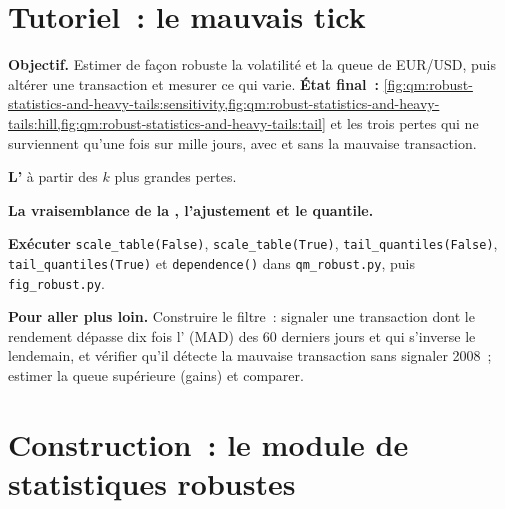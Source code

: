 \section{Tutoriel~: le mauvais tick}\label{tut:qm:robust-statistics-and-heavy-tails:badtick}

\begin{tutorial}
\textbf{Objectif.} Estimer de façon robuste la volatilité et la queue de EUR/USD, puis altérer une transaction et mesurer ce qui varie.
\textbf{État final~:} \cref{fig:qm:robust-statistics-and-heavy-tails:sensitivity,fig:qm:robust-statistics-and-heavy-tails:hill,fig:qm:robust-statistics-and-heavy-tails:tail}
et les trois pertes qui ne surviennent qu'une fois sur mille jours, avec et sans la mauvaise transaction.
\begin{tutsteps}
\item \textbf{L'} à partir des $k$ plus grandes pertes.
\label{lst:qm:robust-statistics-and-heavy-tails:hill}
\item \textbf{La vraisemblance de la , l'ajustement et le quantile.}
\label{lst:qm:robust-statistics-and-heavy-tails:gpd}
\item \textbf{Exécuter} \texttt{scale\_table(False)}, \texttt{scale\_table(True)}, \texttt{tail\_quantiles(False)}, \texttt{tail\_quantiles(True)} et
\texttt{dependence()} dans \texttt{qm\_robust.py}, puis \texttt{fig\_robust.py}.
\end{tutsteps}
\textbf{Pour aller plus loin.} Construire le filtre~: signaler une transaction dont le rendement dépasse dix fois l' (MAD) des 60 derniers jours et qui s'inverse le
lendemain, et vérifier qu'il détecte la mauvaise transaction sans signaler 2008~; estimer la queue supérieure (gains) et comparer.
\end{tutorial}

\section{Construction~: le module de statistiques robustes}\label{bld:qm:robust-statistics-and-heavy-tails:robust}

